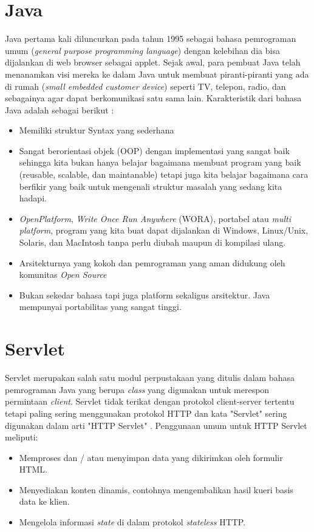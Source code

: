\newpage
\section{Java}
Java pertama kali diluncurkan pada tahun 1995 sebagai bahasa pemrograman umum (\textit{general purpose programming language}) dengan kelebihan dia bisa dijalankan di web browser sebagai applet. Sejak awal, para pembuat Java telah menanamkan visi mereka ke dalam Java untuk membuat piranti-piranti yang ada di rumah (\textit{small embedded customer device}) seperti TV, telepon, radio, dan sebagainya agar dapat berkomunikasi satu sama lain. Karakteristik dari bahasa Java adalah sebagai berikut : \citep{Utama}
\begin{itemize}
	\itemsep0em
	\item Memiliki struktur Syntax yang sederhana
	\item Sangat berorientasi objek (OOP) dengan implementasi yang sangat baik sehingga
	kita bukan hanya belajar bagaimana membuat program yang baik (reusable,
	scalable, dan maintanable) tetapi juga kita belajar bagaimana cara berfikir yang
	baik untuk mengenali struktur masalah yang sedang kita hadapi.
	\item \textit{OpenPlatform}, \textit{Write Once Run Anywhere} (WORA), portabel atau \textit{multi platform}, program yang kita buat dapat dijalankan di Windows, Linux/Unix, Solaris, dan MacIntosh tanpa perlu diubah maupun di kompilasi ulang.
	\item Arsitekturnya yang kokoh dan pemrograman yang aman didukung oleh komunitas
	\textit{Open Source}
	\item Bukan sekedar bahasa tapi juga platform sekaligus arsitektur. Java mempunyai portabilitas yang sangat tinggi.
\end{itemize}

\section{Servlet}
Servlet merupakan salah satu modul perpustakaan yang ditulis dalam bahasa pemrograman Java yang berupa \textit{class} yang digunakan untuk merespon permintaan \textit{client}. Servlet tidak terikat dengan protokol client-server tertentu tetapi paling sering menggunakan protokol HTTP dan kata "Servlet" sering digunakan dalam arti "HTTP Servlet" \citep{zeiger1999servlet}. Penggunaan umum untuk HTTP Servlet meliputi:
\begin{itemize}
	\itemsep0em
	\item Memproses dan / atau menyimpan data yang dikirimkan oleh formulir HTML.
	\item Menyediakan konten dinamis, contohnya mengembalikan hasil kueri basis data ke klien.
	\item Mengelola informasi \textit{state} di dalam protokol \textit{stateless} HTTP.
\end{itemize}
\newpage
